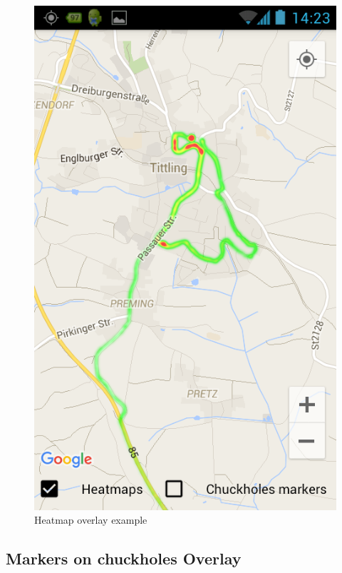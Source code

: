 \documentclass[10pt,a4paper]{article} %
\begin{document}
    \begin{figure}[H]
    \centering
	   
       	\includegraphics[scale = 0.31]{pic4}
       	\caption{Heatmap overlay example}
	\label{fig:heatmap_overlay}
       
    \end{figure}
    
    
    
    
    
    \subsection{Markers on chuckholes Overlay}
    
\end{document}
